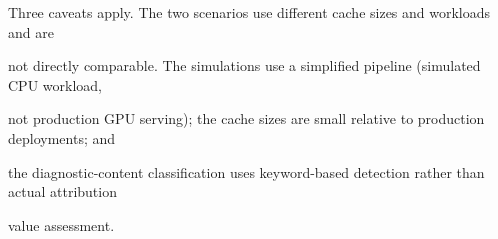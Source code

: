 \begin{flushleft}
\par\smallskip
\par\smallskip
\noindent  Three caveats apply. The two scenarios use different cache sizes and workloads and are\par
\noindent not directly comparable. The simulations use a simplified pipeline (simulated CPU workload,\par
\noindent not production GPU serving); the cache sizes are small relative to production deployments; and\par
\noindent the diagnostic-content classification uses keyword-based detection rather than actual attribution\par
\noindent value assessment.\par
\end{flushleft}
